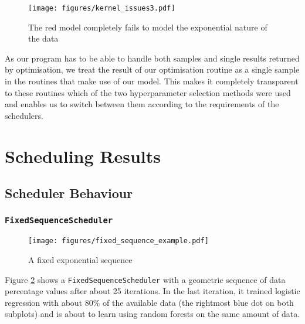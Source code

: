 \documentclass[a4paper,12pt,twoside,openright]{report}
\begin{document}
\begin{figure}
\centering
  \texttt{[image: figures/kernel\_issues3.pdf]}
  \caption{The red model completely fails to model the exponential nature of the data}
  \label{kernel_issues3}
\end{figure}



As our program has to be able to handle both samples and single results returned by optimisation, we treat the result of our optimisation routine as a single sample in the routines that make use of our model. This makes it completely transparent to these routines which of the two hyperparameter selection methods were used and enables us to switch between them according to the requirements of the schedulers.




\section{Scheduling Results}


\subsection{Scheduler Behaviour}

\subsubsection{\texttt{FixedSequenceScheduler}}
\begin{figure}
\centering
  \texttt{[image: figures/fixed\_sequence\_example.pdf]}
  \caption{A fixed exponential sequence}
  \label{fixedsequenceexample}
\end{figure}

Figure \ref{fixedsequenceexample} shows a \texttt{FixedSequenceScheduler} with a geometric sequence of data percentage values after about 25 iterations. In the last iteration, it trained logistic regression with about 80\% of the available data (the rightmost blue dot on both subplots) and is about to learn using random forests on the same amount of data.
\end{document}
